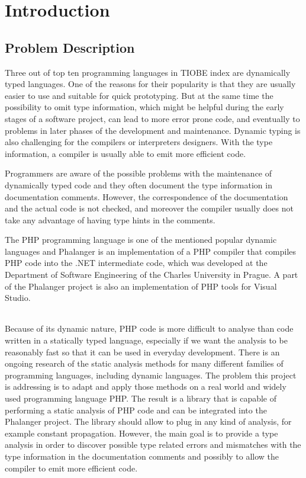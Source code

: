 \chapter{Introduction}

    \section{Problem Description}
    
    Three out of top ten programming languages in TIOBE index\cite{tiobe} 
    are dynamically typed languages. One of the reasons for their popularity 
    is that they are usually easier to use and suitable for quick prototyping.
    But at the same time the possibility to omit type information, which might 
    be helpful during the early stages of a software project, can lead to more 
    error prone code, and eventually to problems in later phases of the 
    development and maintenance. Dynamic typing is also challenging for the 
    compilers or interpreters designers. With the type information, 
    a compiler is usually able to emit more efficient code.
    
    Programmers are aware of the possible problems with the maintenance of 
    dynamically typed code and they often document the type information in 
    documentation comments. However, the correspondence of the documentation 
    and the actual code is not checked, and moreover the compiler usually 
    does not take any advantage of having type hints in the comments.
    
    The PHP programming language is one of the mentioned popular dynamic 
    languages and Phalanger is an implementation of a PHP compiler 
    that compiles PHP code into the .NET intermediate code, which was 
    developed at the Department of Software Engineering 
    of the Charles University in Prague. A part of the 
    Phalanger project is also an implementation of PHP tools 
    for Visual Studio.

    \subparagraph*{}    
    Because of its dynamic nature, PHP code is more difficult to analyse 
    than code written in a statically typed language, especially if we want the 
    analysis to be reasonably fast so that it can be used 
    in everyday development.  There is an ongoing research of the 
    static analysis methods for many different families of programming languages, 
    including dynamic languages. The problem this project is addressing 
    is to adapt and apply those methods on a real world and widely 
    used programming language PHP. The result is a library that is capable of 
    performing a static analysis of PHP code and can be integrated into 
    the Phalanger project. The library should allow to plug in any 
    kind of analysis, for example constant propagation. However, the main goal 
    is to provide a type analysis in order to discover possible type 
    related errors and mismatches with the type information in the 
    documentation comments and possibly to allow the compiler to 
    emit more efficient code.    
    


